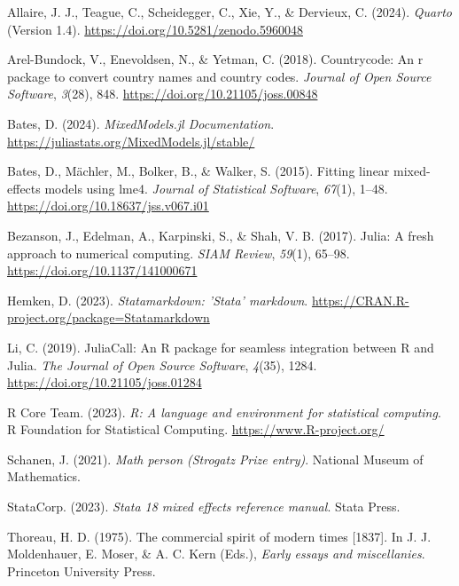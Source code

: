 \documentclass[
  letterpaper,
  DIV=11,
  numbers=noendperiod]{scrreprt}
\newlength{\cslhangindent}
\newenvironment{CSLReferences}[2] %
 {\begin{list}{}{%
  \setlength{\itemindent}{0pt}
  \setlength{\leftmargin}{0pt}
  \setlength{\parsep}{0pt}
  \ifodd #1
   \setlength{\leftmargin}{\cslhangindent}
   \setlength{\itemindent}{-1\cslhangindent}
  \fi
  \setlength{\itemsep}{#2\baselineskip}}}
 {\end{list}}
\begin{document}
\label{refs}
\begin{CSLReferences}{1}{0}
Allaire, J. J., Teague, C., Scheidegger, C., Xie, Y., \& Dervieux, C.
(2024). \emph{{Quarto}} (Version 1.4).
\url{https://doi.org/10.5281/zenodo.5960048}

Arel-Bundock, V., Enevoldsen, N., \& Yetman, C. (2018). Countrycode: An
r package to convert country names and country codes. \emph{Journal of
Open Source Software}, \emph{3}(28), 848.
\url{https://doi.org/10.21105/joss.00848}

Bates, D. (2024). \emph{{MixedModels.jl Documentation}}.
\url{https://juliastats.org/MixedModels.jl/stable/}

Bates, D., Mächler, M., Bolker, B., \& Walker, S. (2015). Fitting linear
mixed-effects models using lme4. \emph{Journal of Statistical Software},
\emph{67}(1), 1--48. \url{https://doi.org/10.18637/jss.v067.i01}

Bezanson, J., Edelman, A., Karpinski, S., \& Shah, V. B. (2017). Julia:
A fresh approach to numerical computing. \emph{SIAM Review},
\emph{59}(1), 65--98. \url{https://doi.org/10.1137/141000671}

Hemken, D. (2023). \emph{Statamarkdown: 'Stata' markdown}.
\url{https://CRAN.R-project.org/package=Statamarkdown}

Li, C. (2019). {JuliaCall}: An {R} package for seamless integration
between {R} and {Julia}. \emph{The Journal of Open Source Software},
\emph{4}(35), 1284. \url{https://doi.org/10.21105/joss.01284}

R Core Team. (2023). \emph{R: A language and environment for statistical
computing}. R Foundation for Statistical Computing.
\url{https://www.R-project.org/}

Schanen, J. (2021). \emph{Math person ({Strogatz Prize} entry)}.
National Museum of Mathematics.

StataCorp. (2023). \emph{Stata 18 mixed effects reference manual}. Stata
Press.

Thoreau, H. D. (1975). The commercial spirit of modern times {[}1837{]}.
In J. J. Moldenhauer, E. Moser, \& A. C. Kern (Eds.), \emph{Early essays
and miscellanies}. Princeton University Press.

\end{CSLReferences}
\end{document}
